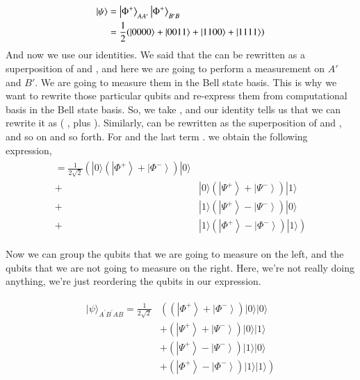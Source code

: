 \begin{align}
    \begin{aligned}
\left| \psi \right\rangle&=\left| \Phi^{+} \right\rangle_{A A^{\prime}}\left| \Phi^{+} \right\rangle_{B^{\prime} B} \\
&=\frac{1}{2}(|0000\rangle+|0011\rangle+|1100\rangle+|1111\rangle)
\end{aligned}
\end{align}
And now we use our identities. We said that the  can be rewritten as a superposition of \ket{\Phi^+} and \ket{\Phi^-}, and here we are going to perform a measurement on $A'$ and $B'$. We are going to measure them in the Bell state basis. This is why we want to rewrite those particular qubits and re-express them from computational basis in the Bell state basis. So, we take , and our identity tells us that we can rewrite it as ( \ket{\Phi^+}, plus \ket{\Phi^-}). Similarly,  can be rewritten as the superposition of \ket{\Psi^+} and \ket{\Psi^-}, and so on and so forth. For  and the last term . we obtain the following expression,
\begin{align}
    \begin{array}{ll}
=\frac{1}{2 \sqrt{2}}\left(|0\rangle\left(\left|\Phi^{+}\right\rangle+\left|\Phi^{-}\right\rangle\right)|0\rangle\right. \\
+ & |0\rangle\left(\left|\Psi^{+}\right\rangle+\left|\Psi^{-}\right\rangle\right)|1\rangle \\
+ & |1\rangle\left(\left|\Psi^{+}\right\rangle-\left|\Psi^{-}\right\rangle\right)|0\rangle \\
+ & \left.|1\rangle\left(\left|\Phi^{+}\right\rangle-\left|\Phi^{-}\right\rangle\right)|1\rangle\right)
\end{array}
\end{align}

Now we can group the qubits that we are going to measure on the left, and the qubits that we are not going to measure on the right. Here, we're not really doing anything, we're just reordering the qubits in our expression. 

\begin{align}
        \begin{aligned}
|\psi\rangle_{A^{\prime} B^{\prime} A B}=\frac{1}{2 \sqrt{2}} &\left(\left(\left|\Phi^{+}\right\rangle+\left|\Phi^{-}\right\rangle\right)|0\rangle|0\rangle\right.\\
&+\left(\left|\Psi^{+}\right\rangle+\left|\Psi^{-}\right\rangle\right)|0\rangle|1\rangle \\
&+\left(\left|\Psi^{+}\right\rangle-\left|\Psi^{-}\right\rangle\right)|1\rangle|0\rangle \\
&\left.+\left(\left|\Phi^{+}\right\rangle-\left|\Phi^{-}\right\rangle\right)|1\rangle|1\rangle\right)
\end{aligned}
\end{align}

